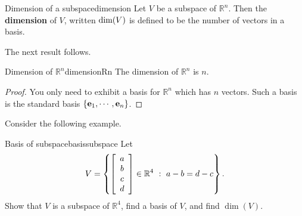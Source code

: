 \begin{definition}{Dimension of a subspace}{dimension}
Let $V$ be a subspace of $\mathbb{R}^{n}$. Then the \textbf{dimension }of $V$, written $\mbox{dim}(V)$
is defined to be the number of vectors in a basis.
\end{definition}

The next result follows.

\begin{corollary}{Dimension of $\mathbb{R}^n$}{dimensionRn}
The dimension of $\mathbb{R}^{n}$ is $n.$ 
\end{corollary}

\begin{proof}
You only need to exhibit a basis for $\mathbb{R}^{n}$ which
has $n$ vectors. Such a basis is the standard basis $\left\{ {\bf e}_{1},\cdots , {\bf e}_{n}\right\} $.
\end{proof}

Consider the following example.

\begin{example}{Basis of subspace}{basissubspace}
Let 
\[ V=\left\{
\left[\begin{array}{c} a\\ b\\ c\\ d\end{array}\right]\in\mathbb{R}^4
~:~ a-b=d-c \right\}.\]
Show that $V$ is a subspace of $\mathbb{R}^4$,
find a basis of $V$, and find $\dim(V)$.
\end{example}


